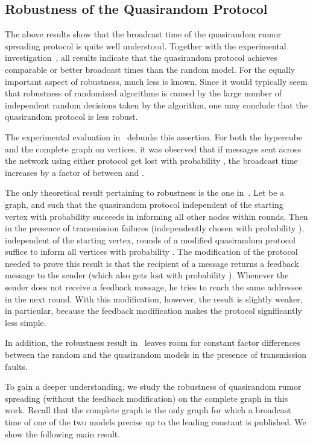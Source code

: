 \documentclass[12pt]{article}
\begin{document}
{\subsection{Robustness of the Quasirandom Protocol}

The above results show that the broadcast time of the quasirandom rumor spreading protocol is quite well understood. Together with the experimental investigation~\cite{DFKS09}, all results indicate that the quasirandom protocol achieves comparable or better broadcast times than the random model. For the equally important aspect of robustness, much less is known. Since it would typically seem that robustness of randomized algorithms is caused by the large number of independent random decisions taken by the algorithm, one may conclude that the quasirandom protocol is less robust. 

The experimental evaluation in~\cite{DFKS09} debunks this assertion. For both the hypercube and the complete graph on  vertices, it was observed that if messages sent across the network using either protocol get lost with probability , the broadcast time increases by a factor of between  and . 

The only theoretical result pertaining to robustness is the one in~\cite{DFS09}. Let  be a graph,  and  such that the quasirandom protocol independent of the starting vertex with probability  succeeds in informing all other nodes within  rounds. Then in the presence of transmission failures (independently chosen with probability ), independent of the starting vertex,  rounds of a modified quasirandom protocol suffice to inform all vertices with probability . The modification of the protocol needed to prove this result is that the recipient of a message returns a feedback message to the sender (which also gets lost with probability ). Whenever the sender does not receive a feedback message, he tries to reach the same addressee in the next round. With this modification, however, the result is slightly weaker, in particular, because the feedback modification makes the protocol significantly less simple.

In addition, the robustness result in~\cite{DFS09} leaves room for constant factor differences between the random and the quasirandom models in the presence of transmission faults. 

To gain a deeper understanding, we study the robustness of quasirandom rumor spreading (without the feedback modification) on the complete graph in this work. Recall that the complete graph is the only graph for which a broadcast time of one of the two models precise up to 
the leading constant is published. We show the following main result.

}
\end{document}
